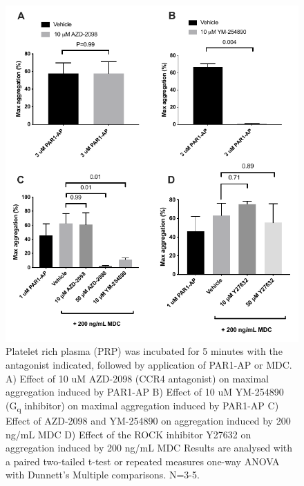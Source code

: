 \documentclass[11pt,twoside]{bristolthesis}
\begin{document}
\begin{figure}
\includegraphics[width=0.95\linewidth]{figure/Chemokines/Layouts/PAR1_MDC_inhibitors_aggregation} \caption[The effect of inhibitors on PAR1-AP and MDC induced aggregation in PRP.]{Platelet rich plasma (PRP) was incubated for 5 minutes with the antagonist indicated, followed by application of PAR1-AP or MDC. A) Effect of 10 uM AZD-2098 (CCR4 antagonist) on maximal aggregation induced by PAR1-AP B) Effect of 10 uM YM-254890 (G\textsubscript{q} inhibitor) on maximal aggregation induced by PAR1-AP C) Effect of AZD-2098 and YM-254890 on aggregation induced by 200 ng/mL MDC D) Effect of the ROCK inhibitor Y27632 on aggregation induced by 200 ng/mL MDC Results are analysed with a paired two-tailed t-test or repeated measures one-way ANOVA with Dunnett's Multiple comparisons. N=3-5.}\label{fig:MDC-PRP-agg-bar}
\end{figure}
\end{document}
